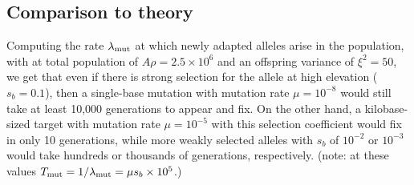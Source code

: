 {{%











\subsection*{Comparison to theory}


Computing the rate $\lambda_{\text{mut}}$ at which newly adapted alleles arise in the population,
with at total population of $A \rho = 2.5 \times 10^6$ and an offspring variance of $\xi^2 = 50$,
we get that even if there is strong selection for the allele at high elevation ($s_b=0.1$),
then a single-base mutation with mutation rate $\mu=10^{-8}$ would still take at least 10,000 generations to appear and fix.
On the other hand, a kilobase-sized target with mutation rate $\mu=10^{-5}$
with this selection coefficient would fix in only 10 generations,
while more weakly selected alleles with $s_b$ of $10^{-2}$ or $10^{-3}$ would take hundreds or thousands of generations, respectively.
(note: at these values $T_{\text{mut}} = 1/\lambda_{\text{mut}} = \mu s_b \times 10^5$.)


}}
